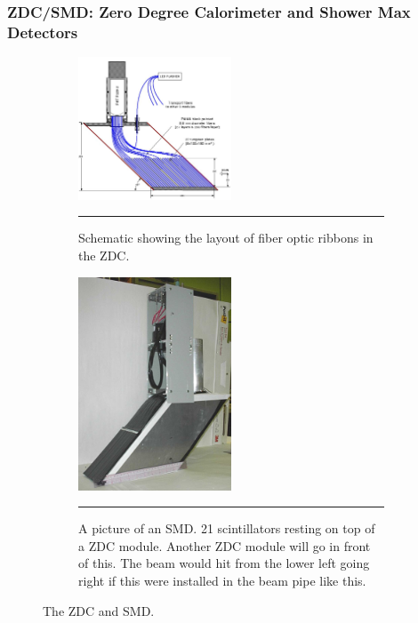 \subsubsection{ZDC/SMD: Zero Degree Calorimeter and Shower Max Detectors}
\label{sect:ZDC}

\begin{figure}

\begin{subfigure}[p]{1\textwidth}
  \centering
    \includegraphics[width=0.5\textwidth]{Figures/ZDCschematic.JPG}

  \caption[Schematic showing a side view of the layout of fiber optics in the ZDC]{Schematic showing the layout of fiber optic ribbons in the ZDC.}
  \label{fig:zdcschem}
   \rule{35em}{0.7pt}
\end{subfigure}
\begin{subfigure}[p]{1\textwidth}
  \centering
    \includegraphics[width=0.5\textwidth]{Figures/SMDonZDC.jpg}

  \caption[Picture of the SMD.]{A picture of an SMD. 21 scintillators resting on top of a ZDC module. Another ZDC module will go in front of this. The beam would hit from the lower left going right if this were installed in the beam pipe like this.}
  \label{fig:smdonzdc}
   \rule{35em}{0.7pt}
\end{subfigure}
\caption{The ZDC and SMD.}
\end{figure}

